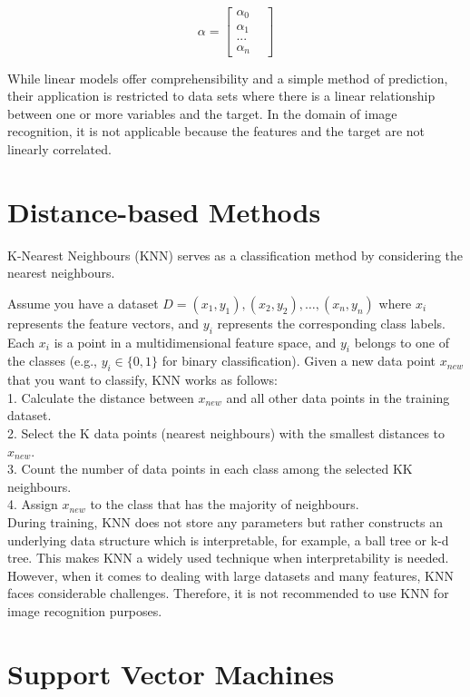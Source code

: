 $$ \alpha = \begin{bmatrix}
	\alpha_0 & \\
	\alpha_1 & \\
	... & \\
	\alpha_n &
\end{bmatrix}
$$

While linear models offer comprehensibility and a simple method of prediction, their application is restricted to data sets where there is a linear relationship between one or more variables and the target. In the domain of image recognition, it is not applicable because the features and the target are not linearly correlated.

\section{Distance-based Methods}
\label{KNN}
K-Nearest Neighbours (KNN) \cite{Mucherino2009} serves as a classification method by considering the nearest neighbours. 


Assume you have a dataset $D={(x_1,y_1),(x_2,y_2),…,(x_n,y_n)}$ where $x_i$ represents the feature vectors, and $y_i$ represents the corresponding class labels. Each $x_i$ is a point in a multidimensional feature space, and $y_i$ belongs to one of the classes (e.g., $y_i \in \{0,1\}$ for binary classification). 
Given a new data point $x_{new}$ that you want to classify, KNN works as follows:\\

1. Calculate the distance between $x_{new}$ and all other data points in the training dataset.\\
2. Select the K data points (nearest neighbours) with the smallest distances to $x_{new}$.\\
3. Count the number of data points in each class among the selected KK neighbours.\\
4. Assign $x_{new}$ to the class that has the majority of neighbours.\\

During training, KNN does not store any parameters but rather constructs an underlying data structure which is interpretable, for example, a ball tree or k-d tree. This makes KNN a widely used technique when interpretability is needed. However, when it comes to dealing with large datasets and many features, KNN faces considerable challenges. Therefore, it is not recommended to use KNN for image recognition purposes.

\section{Support Vector Machines}
\label{sec:svm}

